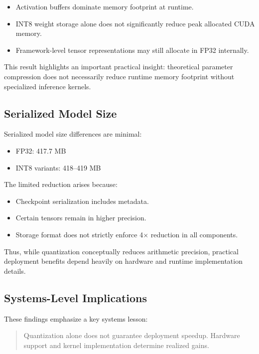 \documentclass[conference]{IEEEtran}
\begin{document}
\begin{itemize}
\item Activation buffers dominate memory footprint at runtime.
\item INT8 weight storage alone does not significantly reduce peak allocated CUDA memory.
\item Framework-level tensor representations may still allocate in FP32 internally.
\end{itemize}

This result highlights an important practical insight: theoretical parameter compression does not necessarily reduce runtime memory footprint without specialized inference kernels.

\subsection{Serialized Model Size}

Serialized model size differences are minimal:

\begin{itemize}
\item FP32: 417.7 MB
\item INT8 variants: 418–419 MB
\end{itemize}

The limited reduction arises because:

\begin{itemize}
\item Checkpoint serialization includes metadata.
\item Certain tensors remain in higher precision.
\item Storage format does not strictly enforce 4× reduction in all components.
\end{itemize}

Thus, while quantization conceptually reduces arithmetic precision, practical deployment benefits depend heavily on hardware and runtime implementation details.

\subsection{Systems-Level Implications}

These findings emphasize a key systems lesson:

\begin{quote}
Quantization alone does not guarantee deployment speedup. Hardware support and kernel implementation determine realized gains.
\end{quote}
\end{document}
